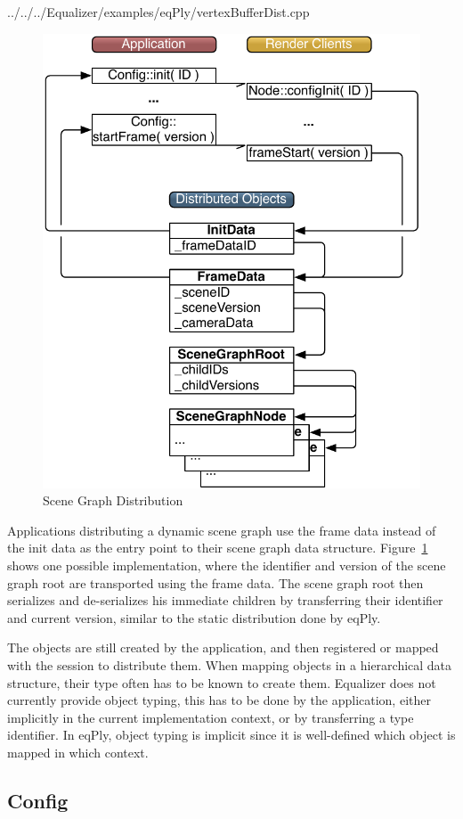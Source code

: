 \documentclass[10pt,a4]{scrartcl}
\newcommand{\fig}[1]{Figure~\ref{#1}}
\begin{document}
{\footnotesize
  {../../../Equalizer/examples/eqPly/vertexBufferDist.cpp}}

\begin{figure}
  \includegraphics[width=.618\textwidth]{images/objects.pdf}
  {\caption{\label{fObjects}Scene Graph Distribution}}
\end{figure}
Applications distributing a dynamic scene graph use the frame data
instead of the init data as the entry point to their scene graph data
structure. \fig{fObjects} shows one possible implementation, where the
identifier and version of the scene graph root are transported using the
frame data. The scene graph root then serializes and de-serializes his
immediate children by transferring their identifier and current version,
similar to the static distribution done by \textsf{eqPly}.

The objects are still created by the application, and then registered or
mapped with the session to distribute them. When mapping
objects in a hierarchical data structure, their type often has to be
known to create them. Equalizer does not currently provide
object typing, this has to be done by the application, either implicitly
in the current implementation context, or by transferring a type
identifier. In \textsf{eqPly}, object typing is implicit since it is
well-defined which object is mapped in which context.


\subsection{Config}
\end{document}
